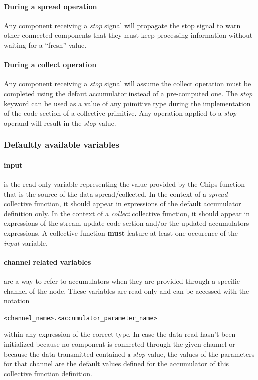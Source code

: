 \documentclass[runningheads]{llncs}
\begin{document}
\paragraph{During a spread operation} Any component receiving a \emph{stop} signal will propagate the stop signal to warn other connected components that they must keep processing information without waiting for a ``fresh'' value. 
\paragraph{During a collect operation} Any component receiving a \emph{stop} signal will assume the collect operation must be completed using the defaut accumulator instead of a pre-computed one.
The \emph{stop} keyword can be used as a value of any primitive type during the implementation of the code section of a collective primitive. Any operation applied to a \emph{stop} operand will result in the \emph{stop} value.

\subsubsection{Defaultly available variables}

\paragraph{input} is the read-only variable representing the value provided by the Chips function that is the source of the data spread/collected. In the context of a \emph{spread} collective function, it should appear in expressions of the default accumulator definition only. In the context of a \emph{collect} collective function, it should appear in expressions of the stream update code section and/or the updated accumulators expressions. A collective function \textbf{must} feature at least one occurence of the \emph{input} variable.

\paragraph{channel related variables} are a way to refer to accumulators when they are provided through a specific channel of the node. These variables are read-only and can be accessed with the notation
\begin{center}
    \verb'<channel_name>.<accumulator_parameter_name>'
\end{center}
within any expression of the correct type. In case the data read hasn't been initialized because no component is connected through the given channel or because the data transmitted contained a \emph{stop} value, the values of the parameters for that channel are the default values defined for the accumulator of this collective function definition.
\end{document}
